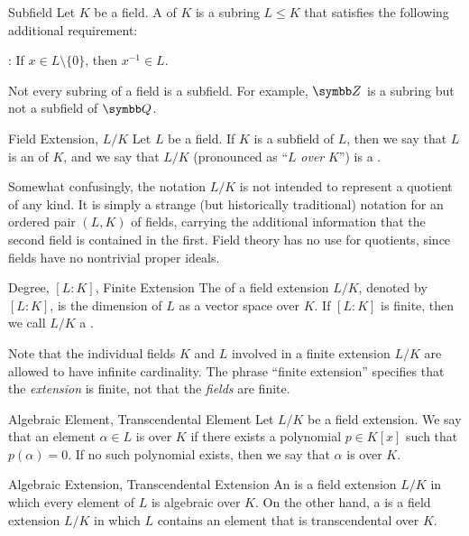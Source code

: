 \begin{dfnbox}{Subfield}
	Let $K$ be a field. A  of $K$ is a subring $L \le K$ that satisfies the following additional requirement:
	\begin{dfnitems}
		\item {}: If $x \in L \setminus \{0\}$, then $x^{-1} \in L$.
	\end{dfnitems}
\end{dfnbox}

Not every subring of a field is a subfield. For example, $\Z$ is a subring but not a subfield of $\Q$.

\begin{dfnbox}{Field Extension, $L/K$}
	Let $L$ be a field. If $K$ is a subfield of $L$, then we say that $L$ is an  of $K$, and we say that $L/K$ (pronounced as ``$L$ \textit{over} $K$'') is a .
\end{dfnbox}

Somewhat confusingly, the notation $L/K$ is not intended to represent a quotient of any kind. It is simply a strange (but historically traditional) notation for an ordered pair $(L, K)$ of fields, carrying the additional information that the second field is contained in the first. Field theory has no use for quotients, since fields have no nontrivial proper ideals.

\begin{dfnbox}{Degree, $[L : K]$, Finite Extension}
	The  of a field extension $L/K$, denoted by $[L : K]$, is the dimension of $L$ as a vector space over $K$. If $[L : K]$ is finite, then we call $L/K$ a .
\end{dfnbox}

Note that the individual fields $K$ and $L$ involved in a finite extension $L/K$ are allowed to have infinite cardinality. The phrase ``finite extension'' specifies that the \textit{extension} is finite, not that the \textit{fields} are finite.

\begin{dfnbox}{Algebraic Element, Transcendental Element}
	Let $L/K$ be a field extension. We say that an element $\alpha \in L$ is  over $K$ if there exists a polynomial $p \in K[x]$ such that $p(\alpha) = 0$. If no such polynomial exists, then we say that $\alpha$ is  over $K$.
\end{dfnbox}

\begin{dfnbox}{Algebraic Extension, Transcendental Extension}
	An  is a field extension $L/K$ in which every element of $L$ is algebraic over $K$. On the other hand, a  is a field extension $L/K$ in which $L$ contains an element that is transcendental over $K$.
\end{dfnbox}

